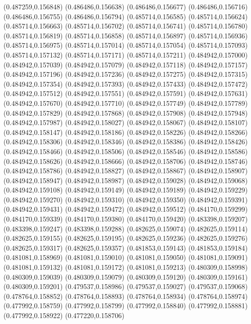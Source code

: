 (0.487259,0.156848)
(0.486486,0.156638)
(0.486486,0.156677)
(0.486486,0.156716)
(0.486486,0.156755)
(0.486486,0.156794)
(0.485714,0.156585)
(0.485714,0.156624)
(0.485714,0.156663)
(0.485714,0.156702)
(0.485714,0.156741)
(0.485714,0.156780)
(0.485714,0.156819)
(0.485714,0.156858)
(0.485714,0.156897)
(0.485714,0.156936)
(0.485714,0.156975)
(0.485714,0.157014)
(0.485714,0.157054)
(0.485714,0.157093)
(0.485714,0.157132)
(0.485714,0.157171)
(0.485714,0.157211)
(0.484942,0.157000)
(0.484942,0.157039)
(0.484942,0.157079)
(0.484942,0.157118)
(0.484942,0.157157)
(0.484942,0.157196)
(0.484942,0.157236)
(0.484942,0.157275)
(0.484942,0.157315)
(0.484942,0.157354)
(0.484942,0.157393)
(0.484942,0.157433)
(0.484942,0.157472)
(0.484942,0.157512)
(0.484942,0.157551)
(0.484942,0.157591)
(0.484942,0.157631)
(0.484942,0.157670)
(0.484942,0.157710)
(0.484942,0.157749)
(0.484942,0.157789)
(0.484942,0.157829)
(0.484942,0.157868)
(0.484942,0.157908)
(0.484942,0.157948)
(0.484942,0.157987)
(0.484942,0.158027)
(0.484942,0.158067)
(0.484942,0.158107)
(0.484942,0.158147)
(0.484942,0.158186)
(0.484942,0.158226)
(0.484942,0.158266)
(0.484942,0.158306)
(0.484942,0.158346)
(0.484942,0.158386)
(0.484942,0.158426)
(0.484942,0.158466)
(0.484942,0.158506)
(0.484942,0.158546)
(0.484942,0.158586)
(0.484942,0.158626)
(0.484942,0.158666)
(0.484942,0.158706)
(0.484942,0.158746)
(0.484942,0.158786)
(0.484942,0.158827)
(0.484942,0.158867)
(0.484942,0.158907)
(0.484942,0.158947)
(0.484942,0.158987)
(0.484942,0.159028)
(0.484942,0.159068)
(0.484942,0.159108)
(0.484942,0.159149)
(0.484942,0.159189)
(0.484942,0.159229)
(0.484942,0.159270)
(0.484942,0.159310)
(0.484942,0.159350)
(0.484942,0.159391)
(0.484942,0.159431)
(0.484942,0.159472)
(0.484942,0.159512)
(0.484170,0.159299)
(0.484170,0.159339)
(0.484170,0.159380)
(0.484170,0.159420)
(0.483398,0.159207)
(0.483398,0.159247)
(0.483398,0.159288)
(0.482625,0.159074)
(0.482625,0.159114)
(0.482625,0.159155)
(0.482625,0.159195)
(0.482625,0.159236)
(0.482625,0.159276)
(0.482625,0.159317)
(0.482625,0.159357)
(0.481853,0.159143)
(0.481853,0.159184)
(0.481081,0.158969)
(0.481081,0.159010)
(0.481081,0.159050)
(0.481081,0.159091)
(0.481081,0.159132)
(0.481081,0.159172)
(0.481081,0.159213)
(0.480309,0.158998)
(0.480309,0.159039)
(0.480309,0.159079)
(0.480309,0.159120)
(0.480309,0.159161)
(0.480309,0.159201)
(0.479537,0.158986)
(0.479537,0.159027)
(0.479537,0.159068)
(0.478764,0.158852)
(0.478764,0.158893)
(0.478764,0.158934)
(0.478764,0.158974)
(0.477992,0.158759)
(0.477992,0.158799)
(0.477992,0.158840)
(0.477992,0.158881)
(0.477992,0.158922)
(0.477220,0.158706)

